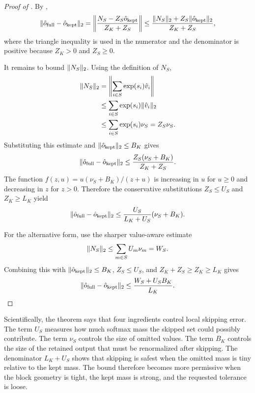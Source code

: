 \begin{proof}[Proof of ]
  By ,
  \begin{equation}
    \lVert \hat{o}_{\mathrm{full}} - \hat{o}_{\mathrm{kept}} \rVert_2
    =
    \left\lVert
      \frac{N_S - Z_S\hat{o}_{\mathrm{kept}}}{Z_K + Z_S}
    \right\rVert
    \le
    \frac{\lVert N_S \rVert_2 + Z_S\lVert \hat{o}_{\mathrm{kept}} \rVert_2}{Z_K + Z_S},
  \end{equation}
  where the triangle inequality is used in the numerator and the denominator is positive because \(Z_K>0\) and \(Z_S\ge0\).

  It remains to bound \(\lVert N_S \rVert_2\). Using the definition of \(N_S\),
  \begin{align}
    \lVert N_S \rVert_2
    &=
    \left\lVert
      \sum_{i \in S} \operatorname{exp}(s_i)\hat{v}_i
    \right\rVert
    \\
    &\le
    \sum_{i \in S} \operatorname{exp}(s_i)\lVert \hat{v}_i \rVert_2
    \\
    &\le
    \sum_{i \in S} \operatorname{exp}(s_i)\nu_S
    =
    Z_S \nu_S.
  \end{align}
  Substituting this estimate and \(\lVert \hat{o}_{\mathrm{kept}} \rVert_2\le B_K\) gives
  \begin{equation}
    \lVert \hat{o}_{\mathrm{full}} - \hat{o}_{\mathrm{kept}} \rVert_2
    \le
    \frac{Z_S(\nu_S + B_K)}{Z_K + Z_S}.
  \end{equation}
  The function \(f(z,u)=u(\nu_S+B_K)/(z+u)\) is increasing in \(u\) for \(u\ge0\) and decreasing in \(z\) for \(z>0\). Therefore the conservative substitutions \(Z_S\le U_S\) and \(Z_K\ge L_K\) yield
  \begin{equation}
    \lVert \hat{o}_{\mathrm{full}} - \hat{o}_{\mathrm{kept}} \rVert_2
    \le
    \frac{U_S}{L_K + U_S}(\nu_S + B_K).
  \end{equation}

  For the alternative form, use the sharper value-aware estimate
  \begin{equation}
    \lVert N_S \rVert_2
    \le
    \sum_{m \in S} U_m \nu_m
    =
    W_S.
  \end{equation}
  Combining this with \(\lVert \hat{o}_{\mathrm{kept}} \rVert_2\le B_K\), \(Z_S\le U_S\), and \(Z_K+Z_S\ge Z_K\ge L_K\) gives
  \begin{equation}
    \lVert \hat{o}_{\mathrm{full}} - \hat{o}_{\mathrm{kept}} \rVert_2
    \le
    \frac{W_S + U_S B_K}{L_K}.
  \end{equation}
\end{proof}

Scientifically, the theorem says that four ingredients control local skipping error. The term \(U_S\) measures how much softmax mass the skipped set could possibly contribute. The term \(\nu_S\) controls the size of omitted values. The term \(B_K\) controls the size of the retained output that must be renormalized after skipping. The denominator \(L_K + U_S\) shows that skipping is safest when the omitted mass is tiny relative to the kept mass. The bound therefore becomes more permissive when the block geometry is tight, the kept mass is strong, and the requested tolerance is loose.

